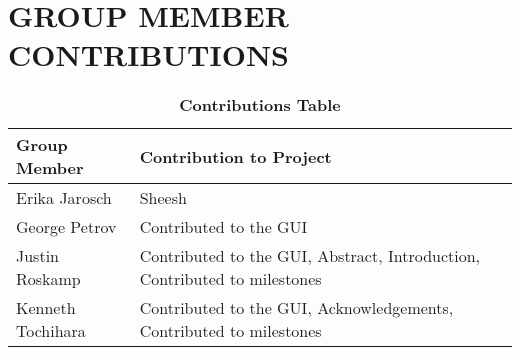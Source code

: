 \appendix

\section{GROUP MEMBER CONTRIBUTIONS} \label{apx:contributions}
    \begin{table}
        \begin{center}
        \caption{\textbf{Contributions Table}}
        \begin{tabular}{ | p{2in} | p{4in}| } 
            \hline
            \textbf{Group Member} & \textbf{Contribution to Project} \\  \hline
            Erika Jarosch & Sheesh \\ \hline
            George Petrov & Contributed to the GUI\\ \hline
            Justin Roskamp & Contributed to the GUI, Abstract, Introduction, Contributed to milestones\\ \hline
            Kenneth Tochihara & Contributed to the GUI, Acknowledgements, Contributed to milestones\\ \hline
        \end{tabular}
        \end{center}
    \end{table}
